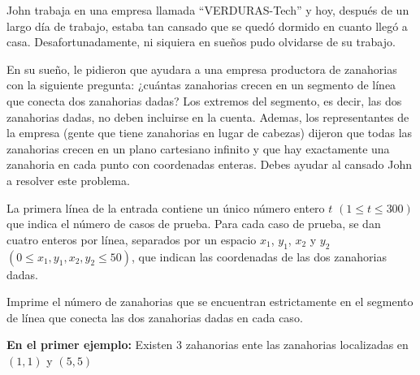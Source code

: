 
John trabaja en una empresa llamada ``VERDURAS-Tech'' y hoy, después de un largo día de trabajo, estaba tan cansado que se quedó dormido en cuanto llegó a casa. Desafortunadamente, ni siquiera en sueños pudo olvidarse de su trabajo. 

En su sueño, le pidieron que ayudara a una empresa productora de zanahorias con la siguiente pregunta: ¿cuántas zanahorias crecen en un segmento de línea que conecta dos zanahorias dadas? Los extremos del segmento, es decir, las dos zanahorias dadas, no deben incluirse en la cuenta. Ademas, los representantes de la empresa (gente que tiene zanahorias en lugar de cabezas) dijeron que todas las zanahorias crecen en un plano cartesiano infinito y que hay exactamente una zanahoria en cada punto con coordenadas enteras. Debes ayudar al cansado John a resolver este problema.


La primera línea de la entrada contiene un único número entero $t$ $(1 \le t \le 300)$ que indica el número de casos de prueba. Para cada caso de prueba, se dan cuatro enteros por línea, separados por un espacio $x_1$, $y_1$, $x_2$ y $y_2$ $(0 \leq x_1, y_1, x_2, y_2 \leq 50)$, que indican las coordenadas de las dos zanahorias dadas.

\outputText

Imprime el número de zanahorias que se encuentran estrictamente en el segmento de línea que conecta las dos zanahorias dadas en cada caso.

\exampleCases

\begin{example}
\end{example}

\explanationText

\textbf{En el primer ejemplo:} Existen $3$ zahanorias ente las zanahorias localizadas en $(1,1)$ y $(5, 5)$

\begin{figure}[h]
    \centering
    
\end{figure}